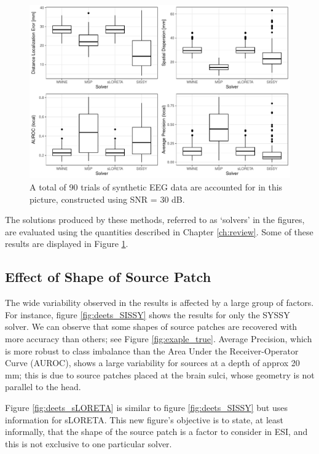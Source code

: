 \begin{figure}
    \centering
    \includegraphics[width=\linewidth]{img_stats/plot_EvalMetrics_Protocol04_30ALL.pdf}
    \caption{A total of 90 trials of synthetic EEG data are accounted for in this picture, constructed using SNR = 30 dB.}
    \label{fig:results1}
\end{figure}

The solutions produced by these methods, referred to as `solvers' in the figures, are evaluated using the quantities described in Chapter \ref{ch:review}.
%
Some of these results are displayed in Figure \ref{fig:results1}.

\subsection{Effect of Shape of Source Patch}

The wide variability observed in the results is affected by a large group of factors.
%
For instance, figure \ref{fig:deets_SISSY} shows the results for only the SYSSY solver.
%
We can observe that some shapes of source patches are recovered with more accuracy than others; see Figure \ref{fig:exaple_true}.
%
Average Precision, which is more robust to class imbalance than the Area Under the Receiver-Operator Curve (AUROC), shows a large variability for sources at a depth of approx 20 mm; this is due to source patches placed at the brain sulci, whose geometry is not parallel to the head.

Figure \ref{fig:deets_sLORETA} is similar to figure \ref{fig:deets_SISSY} but uses information for sLORETA. 
%
This new figure's objective is to state, at least informally, that the shape of the source patch is a factor to consider in ESI,
and this is not exclusive to one particular solver.

